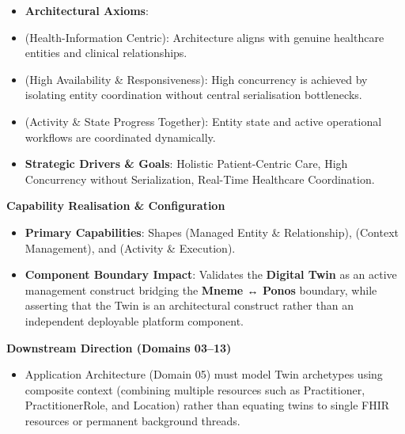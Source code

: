 \begin{itemize}


\item \textbf{Architectural Axioms}:

\item \texttt{} (Health-Information Centric): Architecture aligns with genuine healthcare entities and clinical relationships.

\item \texttt{} (High Availability \& Responsiveness): High concurrency is achieved by isolating entity coordination without central serialisation bottlenecks.

\item \texttt{} (Activity \& State Progress Together): Entity state and active operational workflows are coordinated dynamically.

\item \textbf{Strategic Drivers \& Goals}: Holistic Patient-Centric Care, High Concurrency without Serialization, Real-Time Healthcare Coordination.

\end{itemize}


\par\medskip\textbf{Capability Realisation \& Configuration}\par


\begin{itemize}


\item \textbf{Primary Capabilities}: Shapes \texttt{} (Managed Entity \& Relationship), \texttt{} (Context Management), and \texttt{} (Activity \& Execution).

\item \textbf{Component Boundary Impact}: Validates the \textbf{Digital Twin} as an active management construct bridging the \textbf{Mneme ↔ Ponos} boundary, while asserting that the Twin is an architectural construct rather than an independent deployable platform component.

\end{itemize}


\par\medskip\textbf{Downstream Direction (Domains 03–13)}\par


\begin{itemize}


\item Application Architecture (Domain 05) must model Twin archetypes using composite context (combining multiple resources such as Practitioner, PractitionerRole, and Location) rather than equating twins to single FHIR resources or permanent background threads.

\end{itemize}


